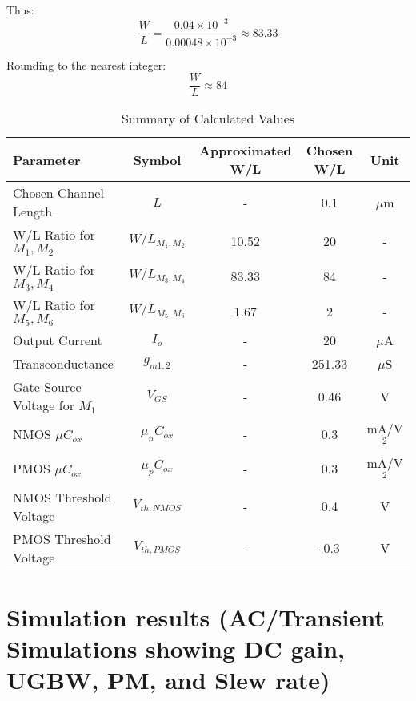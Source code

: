 Thus:
\begin{equation}
    \frac{W}{L} = \frac{0.04 \times 10^{-3}}{0.00048 \times 10^{-3}} \approx 83.33
\end{equation}

Rounding to the nearest integer:
\begin{equation}
    \frac{W}{L} \approx 84
\end{equation}

\begin{table}[h]
    \centering
    \renewcommand{\arraystretch}{1.2}
    \begin{tabular}{|l|c|c|c|c|}
        \hline
        \textbf{Parameter} & \textbf{Symbol} & \textbf{Approximated W/L} & \textbf{Chosen W/L} & \textbf{Unit} \\
        \hline
        Chosen Channel Length & $L$ & - & 0.1 & $\mu$m \\
        \hline
        W/L Ratio for $M_1, M_2$ & $W/L_{M_1,M_2}$ & 10.52 & 20 & - \\
        \hline
        W/L Ratio for $M_3, M_4$ & $W/L_{M_3,M_4}$ & 83.33 & 84 & - \\
        \hline
        W/L Ratio for $M_5, M_6$ & $W/L_{M_5,M_6}$ & 1.67 & 2 & - \\
        \hline
        Output Current & $I_o$ & - & 20 & $\mu$A \\
        \hline
        Transconductance & $g_{m1,2}$ & - & 251.33 & $\mu$S \\
        \hline
        Gate-Source Voltage for $M_1$ & $V_{GS}$ & - & 0.46 & V \\
        \hline
        NMOS $\mu C_{ox}$ & $\mu_n C_{ox}$ & - & 0.3 & mA/V$^2$ \\
        \hline
        PMOS $\mu C_{ox}$ & $\mu_p C_{ox}$ & - & 0.3 & mA/V$^2$ \\
        \hline
        NMOS Threshold Voltage & $V_{th,NMOS}$ & - & 0.4 & V \\
        \hline
        PMOS Threshold Voltage & $V_{th,PMOS}$ & - & -0.3 & V \\
        \hline
    \end{tabular}
    \caption{Summary of Calculated Values}
    \label{tab:summary_values}
\end{table}


\section{Simulation results (AC/Transient Simulations showing DC gain, UGBW, PM, and Slew rate)}



